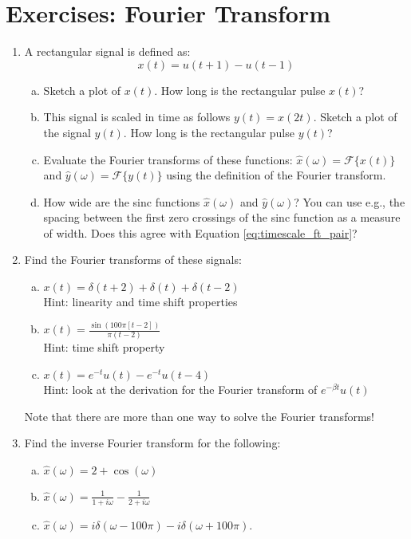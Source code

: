 \newpage
\section*{Exercises: Fourier Transform}
\begin{enumerate}
\item A rectangular signal is defined as:
\begin{equation}
    x(t) = u\left(t+1\right)-u\left(t-1\right)
\end{equation}
\begin{enumerate}[a)]
\item Sketch a plot of $x(t)$. How long is the rectangular pulse $x(t)$?
\item This signal is scaled in time as follows $y(t) = x(2t)$. Sketch a plot of the signal $y(t)$. How long is the rectangular pulse $y(t)$?
\item Evaluate the Fourier transforms of these functions: $\hat{x}(\omega)=\mathcal{F}\{x(t)\}$ and $\hat{y}(\omega)=\mathcal{F}\{y(t)\}$ using the definition of the Fourier transform.
\item How wide are the sinc functions $\hat{x}(\omega)$ and $\hat{y}(\omega)$? You can use e.g., the spacing between the first zero crossings of the sinc function as a measure of width. Does this agree with Equation \ref{eq:timescale_ft_pair}?
\end{enumerate}

\item Find the Fourier transforms of these signals:
\begin{enumerate}[a)]
\item $x(t)=\delta(t+2)+\delta(t)+\delta(t-2)$ \\Hint: linearity and time shift properties
\item $x(t)=\frac{\sin(100\pi [t-2])}{\pi (t-2)}$ \\Hint: time shift property
\item $x(t)=e^{-t}u(t) - e^{-t} u(t-4)$ \\Hint: look at the derivation for the Fourier transform of $e^{-\beta t} u(t)$
\end{enumerate}
Note that there are more than one way to solve the Fourier transforms!

\item Find the inverse Fourier transform for the following:
\begin{enumerate}[a)]
\item $\hat{x}(\omega)= 2 + \cos(\omega)$
\item $\hat{x}(\omega) = \frac{1}{1+i\omega} - \frac{1}{2+i\omega}$
\item $\hat{x}(\omega) = i \delta(\omega - 100\pi) - i\delta(\omega + 100\pi)$.
\end{enumerate}
  

\end{enumerate}
